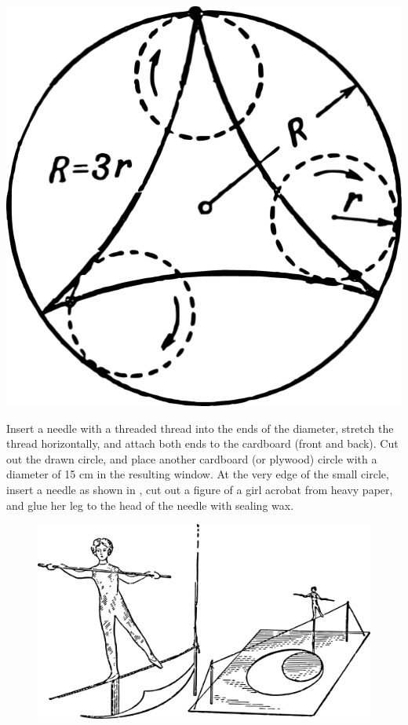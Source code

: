 \begin{marginfigure}[-4cm]%
\centering
\includegraphics[width=\textwidth]{figures/ch-09/fig-131.pdf}
\end{marginfigure}


Insert a needle with a threaded thread into the ends of the diameter, stretch the thread horizontally, and attach both ends to the cardboard (front and back). Cut out the drawn circle, and place another cardboard (or plywood) circle with a diameter of 15 cm in the resulting window. At the very edge of the small circle, insert a needle as shown in , cut out a figure of a girl acrobat from heavy paper, and glue her leg to the head of the needle with sealing wax.

\begin{figure}[h!]
\centering
\includegraphics[width=\textwidth]{figures/ch-09/fig-132.pdf}
\end{figure}

